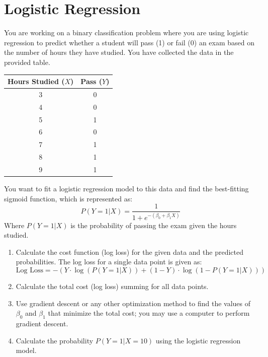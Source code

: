 \documentclass[]{article}
\begin{document}
	
	
	
	\section{Logistic Regression}
	You are working on a binary classification problem where you are using logistic regression to predict whether a student will pass (1) or fail (0) an exam based on the number of hours they have studied. You have collected the data in the provided table.
	
	\begin{table}[h!]
		\centering
		\begin{tabular}{|c|c|}
			\hline
			Hours Studied ($X$) & Pass ($Y$) \\
			\hline
			3 & 0 \\
			4 & 0 \\
			5 & 1 \\
			6 & 0 \\
			7 & 1 \\
			8 & 1 \\
			9 & 1 \\
			\hline
		\end{tabular}
	\end{table}
	
	You want to fit a logistic regression model to this data and find the best-fitting sigmoid function, which is represented as:
	$$P(Y=1|X) = \frac{1}{1 + e^{-(\beta_0 + \beta_1X)}}$$
	Where $P(Y=1|X)$ is the probability of passing the exam given the hours studied.
	
	\begin{enumerate}
		\item Calculate the cost function (log loss) for the given data and the predicted probabilities. The log loss for a single data point is given as:
		$$\text{Log Loss} = -\left(Y \cdot \log(P(Y=1|X)) + (1 - Y) \cdot \log(1 - P(Y=1|X))\right)$$
		\item Calculate the total cost (log loss) summing for all data points.
		\item Use gradient descent or any other optimization method to find the values of $\beta_0$ and $\beta_1$ that minimize the total cost; you may use a computer to perform gradient descent.
		\item Calculate the probability $P(Y=1|X=10)$ using the logistic regression model.
	\end{enumerate}
	
	
\end{document}
